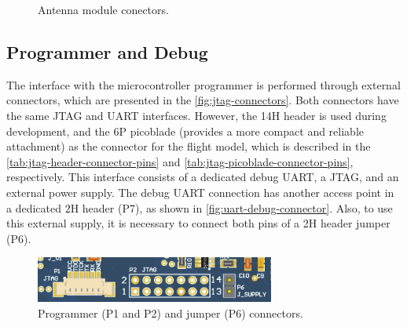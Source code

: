 \begin{figure}[!htb]
    \begin{center}
        \qquad
        \caption{Antenna module conectors.}
        \label{fig:ant-connectors}
    \end{center}
\end{figure}

\subsection{Programmer and Debug} \label{sec:programer-and-debug}

The interface with the microcontroller programmer is performed through external connectors, which are presented in the \autoref{fig:jtag-connectors}. Both connectors have the same JTAG and UART interfaces. However, the 14H header is used during development, and the 6P picoblade (provides a more compact and reliable attachment) as the connector for the flight model, which is described in the \autoref{tab:jtag-header-connector-pins} and \autoref{tab:jtag-picoblade-connector-pins}, respectively. This interface consists of a dedicated debug UART, a JTAG, and an external power supply. The debug UART connection has another access point in a dedicated 2H header (P7), as shown in \autoref{fig:uart-debug-connector}. Also, to use this external supply, it is necessary to connect both pins of a 2H header jumper (P6).

\begin{figure}[!ht]
    \begin{center}
        \includegraphics[width=0.7\textwidth]{figures/jtag-connector.png}
        \caption{Programmer (P1 and P2) and jumper (P6) connectors.}
        \label{fig:jtag-connectors}
    \end{center}
\end{figure}

